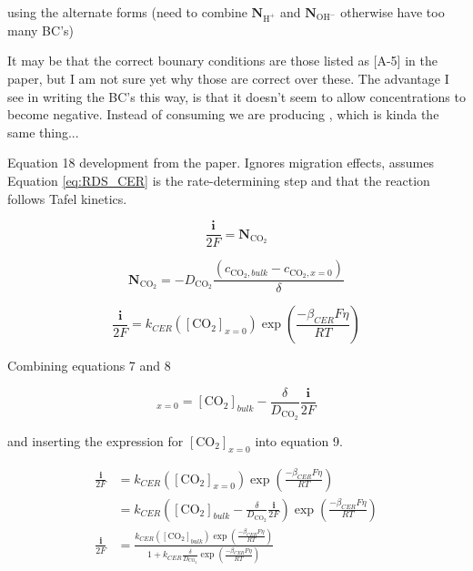 \documentclass[12pt]{article}
\newcommand{\flux}{\mathrm{\mathbf{N}}}
\newcommand{\solcur}{\mathrm{\mathbf{i}}}
\begin{document}
  using the alternate forms (need to combine $\flux_{\text{H}^+}$ and $\flux_{\text{OH}^-}$ otherwise have too many BC's)

  It may be that the correct bounary conditions are those listed as [A-5] in the paper, but I am not sure yet why those are correct over these. The advantage I see in writing the BC's this way, is that it doesn't seem to allow concentrations to become negative. Instead of consuming  we are producing , which is kinda the same thing...

  \clearpage
  Equation 18 development from the paper. Ignores migration effects, assumes Equation \ref{eq:RDS_CER} is the rate-determining step and that the reaction follows Tafel kinetics.

  \begin{equation}
    \frac{\solcur}{2F} = \flux_{\text{CO}_2}
  \end{equation}

  \begin{equation}
    \flux_{\text{CO}_2} = -D_{\text{CO}_2} \frac{\left( c_{\text{CO}_2, bulk} - c_{\text{CO}_2, x=0} \right) }{\delta}
  \end{equation}


  \begin{equation}
    \frac{\solcur}{2F} = k_{CER} \left([\text{CO}_2]_{x=0}\right) \exp{ \left( \frac{-\beta_{CER} F \eta}{RT} \right)}
  \end{equation}

  Combining equations 7 and 8

  \begin{equation*}
    [\text{CO}_2]_{x=0} = [\text{CO}_2]_{bulk} - \frac{\delta}{D_{\text{CO}_2}} \frac{\solcur}{2F}
  \end{equation*}

  and inserting the expression for $[\text{CO}_2]_{x=0}$ into equation 9.

  \begin{align*}
    \frac{\solcur}{2F} &= k_{CER} \left([\text{CO}_2]_{x=0}\right) \exp{ \left( \frac{-\beta_{CER} F \eta}{RT} \right)}
    \\
    &= k_{CER} \left([\text{CO}_2]_{bulk} - \frac{\delta}{D_{\text{CO}_2}} \frac{\solcur}{2F} \right) \exp{ \left( \frac{-\beta_{CER} F \eta}{RT} \right)}
    \\
    \frac{\solcur}{2F} &= \frac{k_{CER} \left([\text{CO}_2]_{bulk}\right) \exp{ \left( \frac{-\beta_{CER} F \eta}{RT} \right)}}{1 + k_{CER} \frac{\delta}{D_{\text{CO}_2}} \exp{ \left( \frac{-\beta_{CER} F \eta}{RT} \right)}}
  \end{align*}
\end{document}
